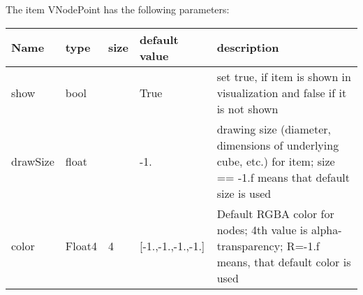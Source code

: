 The item VNodePoint has the following parameters:
\begin{center}
  \footnotesize
  \begin{longtable}{| p{4.5cm} | p{2.5cm} | p{0.5cm} | p{2.5cm} | p{6cm} |}
    \hline
    \bf Name & \bf type & \bf size & \bf default value & \bf description \\ \hline
    show &     bool &      &     True &     set true, if item is shown in visualization and false if it is not shown\\ \hline
    drawSize &     float &      &     -1. &     drawing size (diameter, dimensions of underlying cube, etc.)  for item; size == -1.f means that default size is used\\ \hline
    color &     Float4 &     4 &     [-1.,-1.,-1.,-1.] &     Default RGBA color for nodes; 4th value is alpha-transparency; R=-1.f means, that default color is used\\ \hline
	  \end{longtable}
	\end{center}

